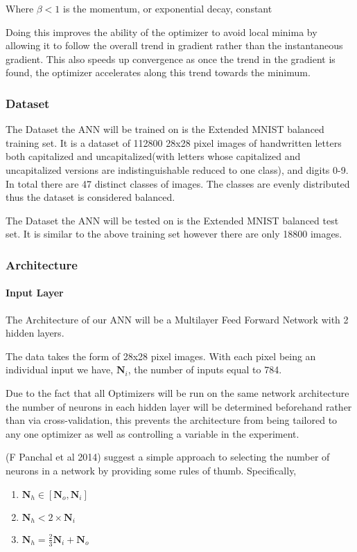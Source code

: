 \documentclass{article}
\begin{document}
 \hfill \newline
Where $\beta<1$ is the momentum, or exponential decay, constant 
 \hfill \newline
 
Doing this improves the ability of the optimizer to avoid local minima by allowing it to follow the overall trend in gradient rather than the instantaneous gradient. This also speeds up convergence as once the trend in the gradient is found, the optimizer accelerates along this trend towards the minimum.
\hfill\newpage

\subsubsection{Dataset}

The Dataset the ANN will be trained on is the Extended MNIST balanced training set. It is a dataset of 112800 28x28 pixel images of handwritten letters both capitalized and uncapitalized(with letters whose capitalized and uncapitalized versions are indistinguishable reduced to one class), and digits 0-9. In total there are 47 distinct classes of images. The classes are evenly distributed thus the dataset is considered balanced.

The Dataset the ANN will be tested on is the Extended MNIST balanced test set. It is similar to the above training set however there are only 18800 images.

\subsubsection{Architecture}

\paragraph{Input Layer}
The Architecture of our ANN will be a Multilayer Feed Forward Network with 2 hidden layers.

The data takes the form of 28x28 pixel images. With each pixel being an individual input we have, $\boldsymbol{N}_i$, the number of inputs equal to 784.


 Due to the fact that all Optimizers will be run on the same network architecture the number of neurons in each hidden layer will be determined beforehand rather than via cross-validation, this prevents the architecture from being tailored to any one optimizer as well as controlling a variable in the experiment.
 
 (F Panchal et al 2014) suggest a simple approach to selecting the number of neurons in a network by providing some rules of thumb. Specifically,
\begin{enumerate}
	\item	$\boldsymbol{N}_h\in[\boldsymbol{N}_o, \boldsymbol{N}_i]$
	
	\item$\boldsymbol{N}_h < 2\times\boldsymbol{N}_i$
	
	\item$\boldsymbol{N}_h = \frac{2}{3}\boldsymbol{N}_i + \boldsymbol{N}_o$
\end{enumerate}
 
\end{document}
